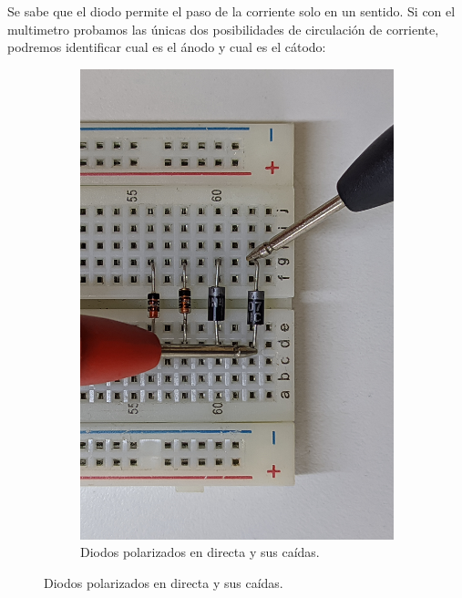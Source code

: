 \documentclass[chaptersright]{informeutn}
\begin{document}
    Se sabe que el diodo permite el paso de la corriente solo en un sentido. Si con el multimetro probamos las únicas
    dos posibilidades de circulación de corriente, podremos identificar cual es el ánodo y cual es el cátodo:
    \begin{figure}[!ht]
      \begin{subfigure}[b]{1\textwidth}
        \centering
        \caption{Diodos polarizados en directa y sus caídas.}
        \begin{minipage}[b]{0.24\textwidth}
          \centering
          \includegraphics[angle=-90, width=1\textwidth]{pictures/prot_diod-1d.jpg}

\end{minipage}
\end{subfigure}
\end{figure}
\end{document}
